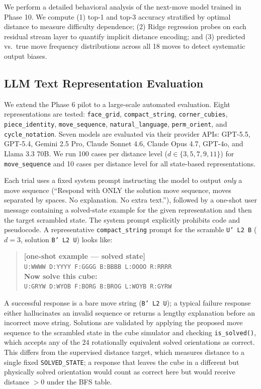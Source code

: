 \documentclass[12pt]{article}
\begin{document}
We perform a detailed behavioral analysis of the next-move model trained in Phase
10.  We compute (1) top-1 and top-3 accuracy stratified by optimal distance to
measure difficulty dependence; (2) Ridge regression probes on each residual
stream layer to quantify implicit distance encoding; and (3) predicted vs.\ true
move frequency distributions across all 18 moves to detect systematic output
biases.

\subsection{LLM Text Representation Evaluation}

We extend the Phase 6 pilot to a large-scale automated evaluation.  Eight
representations are tested: \texttt{face\_grid}, \texttt{compact\_string},
\texttt{corner\_cubies}, \texttt{piece\_identity}, \texttt{move\_sequence},
\texttt{natural\_language}, \texttt{perm\_orient}, and \texttt{cycle\_notation}.
Seven models are evaluated via their provider APIs: GPT-5.5, GPT-5.4, Gemini 2.5
Pro, Claude Sonnet 4.6, Claude Opus 4.7, GPT-4o, and Llama 3.3 70B.  We run 100
cases per distance level ($d \in \{3, 5, 7, 9, 11\}$) for \texttt{move\_sequence}
and 10 cases per distance level for all state-based representations.

Each trial uses a fixed system prompt instructing the model to output \emph{only}
a move sequence (``Respond with ONLY the solution move sequence, moves separated
by spaces. No explanation. No extra text.''), followed by a one-shot user message
containing a solved-state example for the given representation and then the target
scrambled state.  The system prompt explicitly prohibits code and pseudocode.  A
representative \texttt{compact\_string} prompt for the scramble
\texttt{U' L2 B} ($d{=}3$, solution \texttt{B' L2 U}) looks like:

\begin{quote}\small
\textbf{[one-shot example — solved state]}\\
\texttt{U:WWWW D:YYYY F:GGGG B:BBBB L:OOOO R:RRRR}\\[2pt]
\textbf{Now solve this cube:}\\
\texttt{U:GRYW D:WYOB F:BORG B:BROG L:WOYB R:GYRW}
\end{quote}

A successful response is a bare move string (\texttt{B' L2 U}); a typical failure
response either hallucinates an invalid sequence or returns a lengthy explanation
before an incorrect move string.  Solutions are validated by applying the proposed
move sequence to the scrambled state in the cube simulator and checking
\texttt{is\_solved()}, which accepts any of the 24 rotationally equivalent
solved orientations as correct.  This differs from the supervised distance
target, which measures distance to a single fixed \texttt{SOLVED\_STATE};
a response that leaves the cube in a different but physically solved orientation
would count as correct here but would receive distance $> 0$ under the BFS table.
\end{document}
